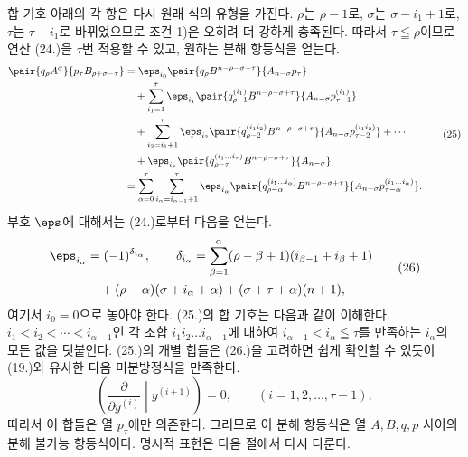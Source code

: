 
합 기호 아래의 각 항은 다시 원래 식의 유형을 가진다. $\rho$는 $\rho-1$로, $\sigma$는 $\sigma-i_1+1$로, $\tau$는 $\tau-i_1$로 바뀌었으므로 조건 1)은 오히려 더 강하게 충족된다. 따라서 $\tau\leqq\rho$이므로 연산 (24.)을 $\tau$번 적용할 수 있고, 원하는 분해 항등식을 얻는다.
\begin{equation}
\begin{aligned}
\pair{q_\rho A^\sigma}{p_\tau B_{\rho+\sigma-\tau}}
&=\eps_{i_0}\pair{q_\rho B^{n-\rho-\sigma+\tau}}{A_{n-\sigma}p_\tau}\\
&\quad+\sum_{i_1=1}^{\tau}\eps_{i_1}
 \pair{q_{\rho-1}^{(i_1)}B^{n-\rho-\sigma+\tau}}{A_{n-\sigma}p_{\tau-1}^{(i_1)}}\\
&\quad+\sum_{i_2=i_1+1}^{\tau}\eps_{i_2}
 \pair{q_{\rho-2}^{(i_1i_2)}B^{n-\rho-\sigma+\tau}}{A_{n-\sigma}p_{\tau-2}^{(i_1i_2)}}+\cdots\\
&\quad+\eps_{i_\tau}\pair{q_{\rho-\tau}^{(i_1\ldots i_\tau)}B^{n-\rho-\sigma+\tau}}{A_{n-\sigma}}\\
&=\sum_{\alpha=0}^{\tau}\sum_{i_\alpha=i_{\alpha-1}+1}^{\tau}\eps_{i_\alpha}
 \pair{q_{\rho-\alpha}^{(i_1\ldots i_\alpha)}B^{n-\rho-\sigma+\tau}}{A_{n-\sigma}p_{\tau-\alpha}^{(i_1\ldots i_\alpha)}}.
\end{aligned}
\tag{25}
\end{equation}
부호 $\eps$에 대해서는 (24.)로부터 다음을 얻는다.
\begin{equation}
\begin{aligned}
\eps_{i_\alpha}&=(-1)^{\delta_{i_\alpha}},\qquad
\delta_{i_\alpha}=\sum_{\beta=1}^{\alpha}(\rho-\beta+1)(i_{\beta-1}+i_\beta+1)\\
&\quad +(\rho-\alpha)(\sigma+i_\alpha+\alpha)+(\sigma+\tau+\alpha)(n+1),
\end{aligned}
\tag{26}
\end{equation}
여기서 $i_0=0$으로 놓아야 한다. (25.)의 합 기호는 다음과 같이 이해한다. $i_1<i_2<\cdots<i_{\alpha-1}$인 각 조합 $i_1i_2\ldots i_{\alpha-1}$에 대하여 $i_{\alpha-1}<i_\alpha\leqq\tau$를 만족하는 $i_\alpha$의 모든 값을 덧붙인다. (25.)의 개별 합들은 (26.)을 고려하면 쉽게 확인할 수 있듯이 (19.)와 유사한 다음 미분방정식을 만족한다.
\begin{equation}
 \left(\frac{\partial}{\partial y^{(i)}}\middle|y^{(i+1)}\right)=0,
 \qquad (i=1,2,\ldots,\tau-1),
\tag{27}
\end{equation}
따라서 이 합들은 열 $p_\tau$에만 의존한다. 그러므로 이 분해 항등식은 열 $A,B,q,p$ 사이의 분해 불가능 항등식이다. 명시적 표현은 다음 절에서 다시 다룬다.
